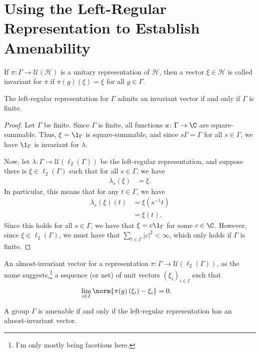 \documentclass[10pt]{mypackage}
\begin{document}
\section{Using the Left-Regular Representation to Establish Amenability}%
If $\pi\colon \Gamma\rightarrow \mathcal{U}\left(\mathcal{H}\right)$ is a unitary representation of $\mathcal{H}$, then a vector $\xi\in \mathcal{H}$ is called invariant for $\pi$ if $\pi(g)\left(\xi\right) = \xi$ for all $g\in \Gamma$.
\begin{proposition}
  The left-regular representation for $\Gamma$ admits an invariant vector if and only if $\Gamma$ is finite.
\end{proposition}
\begin{proof}
  Let $\Gamma$ be finite. Since $\Gamma$ is finite, all functions $a\colon \Gamma\rightarrow \C$ are square-summable. Thus, $\xi = \1_{\Gamma}$ is square-summable, and since $s\Gamma = \Gamma$ for all $s\in\Gamma$, we have $\1_{\Gamma}$ is invariant for $\lambda$.\newline

  Now, let $\lambda\colon \Gamma\rightarrow \mathcal{U}\left(\ell_2\left(\Gamma\right)\right)$ be the left-regular representation, and suppose there is $\xi\in \ell_2\left(\Gamma\right)$ such that for all $s\in \Gamma$, we have
  \begin{align*}
    \lambda_s\left(\xi\right) &= \xi.
  \end{align*}
  In particular, this means that for any $t\in \Gamma$, we have
  \begin{align*}
    \lambda_s\left(\xi\right)\left(t\right) &= \xi\left(s^{-1}t\right)\\
                                            &= \xi\left(t\right).
  \end{align*}
  Since this holds for all $s\in \Gamma$, we have that $\xi = c\1_{\Gamma}$ for some $c\in \C$. However, since $\xi\in \ell_2\left(\Gamma\right)$, we must have that $\sum_{t\in\Gamma} \left\vert c \right\vert^2 < \infty$, which only holds if $\Gamma$ is finite.
\end{proof}
An almost-invariant vector for a representation $\pi\colon \Gamma\rightarrow \mathcal{U}\left(\ell_2\left(\Gamma\right)\right)$, as the name suggests,\footnote{I'm only mostly being facetious here.} a sequence (or net) of unit vectors $\left(\xi_i\right)_{i\in I}$ such that
\begin{align*}
  \lim_{i\in I}\norm{\pi(g)\left(\xi_i\right) - \xi_i} &= 0.
\end{align*}
\begin{theorem}
  A group $\Gamma$ is amenable if and only if the left-regular representation has an almost-invariant vector.
\end{theorem}
\end{document}
